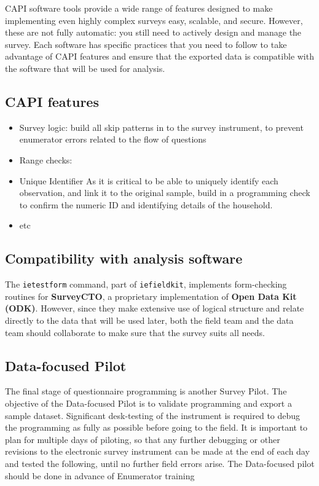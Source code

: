 CAPI software tools provide a wide range of features designed to make implementing even highly complex surveys easy, scalable, and secure. However, these are not fully automatic: you still need to actively design and manage the survey. Each software has specific practices that you need to follow to take advantage of CAPI features and ensure that the exported data is compatible with the software that will be used for analysis. 

\subsection{CAPI features}
\begin{itemize}
	\item{Survey logic}: build all skip patterns in to the survey instrument, to prevent enumerator errors related to the flow of questions
	\item{Range checks}: 
\item{Unique Identifier}
As it is critical to be able to uniquely identify each observation, and link it to the original sample, build in a programming check to confirm the numeric ID and identifying details of the household. 
\item{etc}
\end{itemize}

\subsection{Compatibility with analysis software}
The \texttt{ietestform} command, part of
\texttt{iefieldkit}, implements form-checking routines for \textbf{SurveyCTO}, a proprietary implementation of \textbf{Open Data Kit (ODK)}.
However, since they make extensive use of logical structure and relate directly to the data that will be used later,
both the field team and the data team should collaborate to make sure that the survey suits all needs.\cite{krosnick2018questionnaire}


\subsection{Data-focused Pilot}
The final stage of questionnaire programming is another Survey Pilot. The objective of the Data-focused Pilot  is to validate programming and export a sample dataset. Significant desk-testing of the instrument is required to debug the programming as fully as possible before going to the field. It is important to plan for multiple days of piloting, so that any further debugging or other revisions to the electronic survey instrument can be made at the end of each day and tested the following, until no further field errors arise. The Data-focused pilot should be done in advance of Enumerator training




